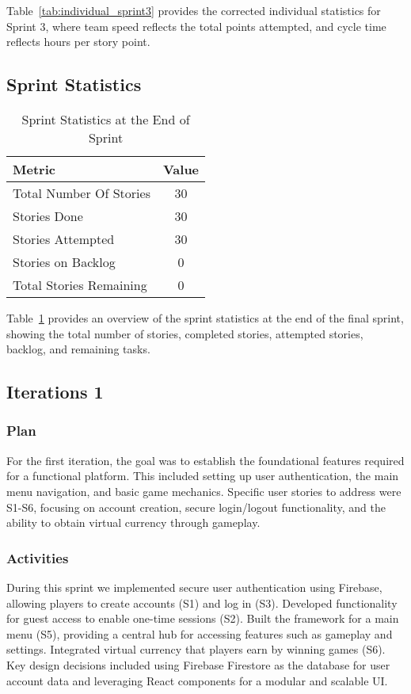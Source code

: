 Table~\ref{tab:individual_sprint3} provides the corrected individual statistics for Sprint 3, where team speed reflects the total points attempted, and cycle time reflects hours per story point.



\subsection{Sprint Statistics}
\begin{table}[H]
    \centering
    \begin{tabular}{|l|c|}
    \hline
    \textbf{Metric} & \textbf{Value} \\ \hline
    Total Number Of Stories & 30 \\ \hline
    Stories Done & 30 \\ \hline
    Stories Attempted & 30 \\ \hline
    Stories on Backlog & 0 \\ \hline
    Total Stories Remaining & 0 \\ \hline
    \end{tabular}
    \caption{Sprint Statistics at the End of Sprint}
    \label{tab:sprint_statistics}
\end{table}

Table~\ref{tab:sprint_statistics} provides an overview of the sprint statistics at the end of the final sprint, showing the total number of stories, completed stories, attempted stories, backlog, and remaining tasks.


\subsection{Iterations 1}

\subsubsection{Plan}
For the first iteration, the goal was to establish the foundational features required for a functional platform. This included setting up user authentication, the main menu navigation, and basic game mechanics. Specific user stories to address were S1-S6, focusing on account creation, secure login/logout functionality, and the ability to obtain virtual currency through gameplay.

\subsubsection{Activities}
During this sprint we implemented secure user authentication using Firebase, allowing players to create accounts (S1) and log in (S3). Developed functionality for guest access to enable one-time sessions (S2). Built the framework for a main menu (S5), providing a central hub for accessing features such as gameplay and settings. Integrated virtual currency that players earn by winning games (S6). Key design decisions included using Firebase Firestore as the database for user account data and leveraging React components for a modular and scalable UI.

